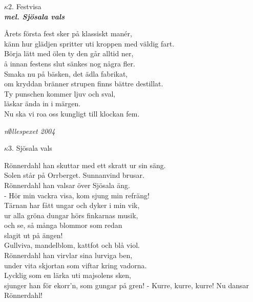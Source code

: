 \documentclass[a6paper,10pt]{article}
\newcommand{\mel}[1]{\small\textbf{\textit{mel. #1 \\}}}
\begin{document}
\setlength{\oddsidemargin}{-0.47in}
\noindent
\begin{center}
\Large $\kappa2$. Festvisa \\ 
\mel{Sjösala vals}
\end{center}
Årets första fest sker på klassiskt manér,\\
känn hur glädjen spritter uti kroppen med väldig fart.\\
Börja lätt med ölen ty den går alltid ner,\\
å innan festens slut sänkes nog några fler.
\vspace{5pt}\\
Smaka nu på bäsken, det ädla fabrikat,\\
om kryddan bränner strupen finns bättre destillat.\\
Ty punschen kommer ljuv och sval,\\
läskar ända in i märgen.\\
Nu ska vi roa oss kungligt till klockan fem.
\begin{flushright}
\textit{n$\emptyset$llespexet 2004}%
\end{flushright}
\begin{center}
\Large $\kappa3$. Sjösala vals \\ 
\end{center}
Rönnerdahl han skuttar med ett skratt ur sin säng.\\
Solen står på Orrberget. Sunnanvind brusar.\\
Rönnerdahl han valsar över Sjösala äng.\\
- Hör min vackra visa, kom sjung min refräng!
\vspace{5pt}\\
Tärnan har fått ungar och dyker i min vik,\\
ur alla gröna dungar hörs finkarnas musik,\\
och se, så många blommor som redan \\
slagit ut på ängen!\\
Gullviva, mandelblom, kattfot och blå viol.
\vspace{5pt}\\
Rönnerdahl han virvlar sina lurviga ben,\\
under vita skjortan som viftar kring vadorna.\\
Lycklig som en lärka uti majsolens sken,\\
sjunger han för ekorr'n, som gungar på gren!
\setlength{\oddsidemargin}{-0.37in}
\noindent
- Kurre, kurre, kurre! Nu dansar Rönnerdahl!\\
\end{document}
